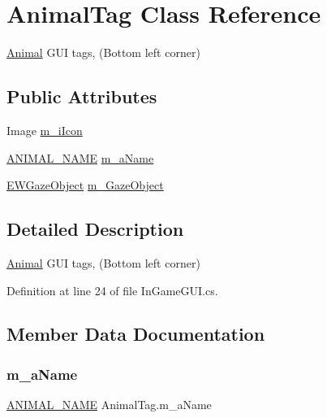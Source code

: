 \hypertarget{class_animal_tag}{}\section{Animal\+Tag Class Reference}
\label{class_animal_tag}


\mbox{\hyperlink{class_animal}{Animal}} G\+UI tags, (Bottom left corner)  


\subsection*{Public Attributes}
\begin{DoxyCompactItemize}
\item 
Image \mbox{\hyperlink{class_animal_tag_ab0d559236d6dc058bfdfb801e1042534}{m\+\_\+i\+Icon}}
\item 
\mbox{\hyperlink{_animal_8cs_a2fa5713399b84d1b88dae9196837af50}{A\+N\+I\+M\+A\+L\+\_\+\+N\+A\+ME}} \mbox{\hyperlink{class_animal_tag_ab314b2c184a2f3f086b2ffafe452de34}{m\+\_\+a\+Name}}
\item 
\mbox{\hyperlink{class_e_w_gaze_object}{E\+W\+Gaze\+Object}} \mbox{\hyperlink{class_animal_tag_ad59322b0f61cb02af3cf4bfe611af536}{m\+\_\+\+Gaze\+Object}}
\end{DoxyCompactItemize}


\subsection{Detailed Description}
\mbox{\hyperlink{class_animal}{Animal}} G\+UI tags, (Bottom left corner) 



Definition at line 24 of file In\+Game\+G\+U\+I.\+cs.



\subsection{Member Data Documentation}
\mbox{\label{class_animal_tag_ab314b2c184a2f3f086b2ffafe452de34}} 
\subsubsection{\texorpdfstring{m\+\_\+a\+Name}{m\_aName}}
{\footnotesize\ttfamily \mbox{\hyperlink{_animal_8cs_a2fa5713399b84d1b88dae9196837af50}{A\+N\+I\+M\+A\+L\+\_\+\+N\+A\+ME}} Animal\+Tag.\+m\+\_\+a\+Name}




